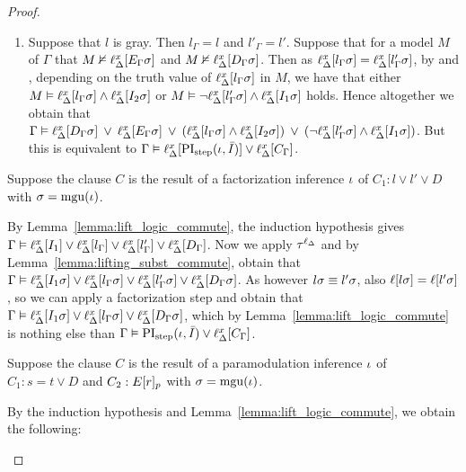 \begin{proof}
\begin{indproof}
\begin{enumerate}
				\item Suppose that $l$ is gray.
					Then $l_\Gamma = l$ and $l'_\Gamma = l'$.
					Suppose that for a model $M$ of $\Gamma$ that $M \nvDash \ell_{\Delta}^{x}[E_\Gamma\sigma]$ and $M \nvDash \ell_{\Delta}^{x}[D_\Gamma\sigma]$.
					Then as $\ell_{\Delta}^{x}[l_\Gamma \sigma] = \ell_{\Delta}^{x}[l'_\Gamma\sigma]$, by \markA{} and \markB{}, depending on the truth value of $\ell_{\Delta}^{x}[l_\Gamma \sigma]$ in $M$, we have that either $M \vDash \ell_{\Delta}^{x}[l_\Gamma\sigma] \land \ell_{\Delta}^{x}[I_2\sigma]$ or $M \vDash \lnot\ell_{\Delta}^{x}[l'_\Gamma\sigma] \land \ell_{\Delta}^{x}[I_1\sigma]$ holds.
					Hence altogether we obtain that 
					$\Gamma \vDash
					\ell_{\Delta}^{x}[D_\Gamma\sigma] \;\,{\lor}\;\,
					\ell_{\Delta}^{x}[E_\Gamma\sigma] \;\,{\lor}\;\,\allowbreak
					(\ell_{\Delta}^{x}[l_\Gamma\sigma] \land \ell_{\Delta}^{x}[I_2\sigma]) \;\,{\lor}\;\,\allowbreak
					(\lnot\ell_{\Delta}^{x}[l'_\Gamma\sigma] \land \ell_{\Delta}^{x}[I_1\sigma])$.
					But this is equivalent to
					$\Gamma \vDash \ell_{\Delta}^{x}[\operatorname{PI}_{\mathrm{step}}(\iota, \bar I)] \lor \ell_{\Delta}^{x}[C_\Gamma]$.

			\end{enumerate}


			Suppose the clause $C$ is the result of a factorization inference $\iota$ of $C_1: l \lor l' \lor D$ with $\sigma=\operatorname{mgu}(\iota)$.

			By Lemma~\ref{lemma:lift_logic_commute}, the induction hypothesis gives $\Gamma \vDash \ell_{\Delta}^{x}[ I_1 ] \lor \ell_{\Delta}^{x}[ l_\Gamma] \lor \ell_{\Delta}^{x}[l'_\Gamma] \lor \ell_{\Delta}^{x}[D_\Gamma ]$.
			Now we apply $\tau^{\ell_\Delta}$
			and by Lemma~\ref{lemma:lifting_subst_commute}, obtain that 
			$\Gamma \vDash \ell_{\Delta}^{x}[ I_1\sigma ] \lor \ell_{\Delta}^{x}[ l_\Gamma\sigma ] \lor  \ell_{\Delta}^{x}[l'_\Gamma\sigma] \lor \ell_{\Delta}^{x}[D_\Gamma\sigma ]$.
			As however $l\sigma \equiv l'\sigma$, 
			also $\ell[l\sigma] = \ell[l'\sigma]$, so we can apply a factorization step and obtain that
			$\Gamma \vDash \ell_{\Delta}^{x}[ I_1\sigma ] \lor \ell_{\Delta}^{x}[ l_\Gamma\sigma] \lor \ell_{\Delta}^{x}[D_\Gamma\sigma ]$,
			which by Lemma~\ref{lemma:lift_logic_commute} is nothing else than $\Gamma \vDash \operatorname{PI}_{\mathrm{step}}(\iota, \bar I) \lor \ell_{\Delta}^{x}[C_\Gamma]$.

			Suppose the clause $C$ is the result of a paramodulation inference\nolinebreak{} $\iota$ of $C_1: s=t \lor D$ and $C_2: E{[r]_{p}}$ with $\sigma=\operatorname{mgu}(\iota)$.

			By the induction hypothesis and Lemma~\ref{lemma:lift_logic_commute}, we obtain the following: 


\end{indproof}
\end{proof}
